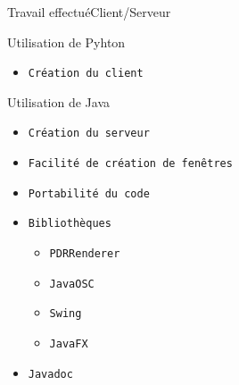 \documentclass[10pt]{beamer}
\begin{document}
\begin{frame}{Travail effectué}{Client/Serveur}
	\begin{block}{Utilisation de Pyhton}
	  	\begin{itemize}
	  		\item {\tt Création du client}		
		\end{itemize}
	\end{block}


	\begin{block}{Utilisation de Java}
	  	\begin{itemize}
	  		\item {\tt Création du serveur}
    			\item {\tt Facilité de création de fenêtres}
	    		\item {\tt Portabilité du code}
	    		\item {\tt Bibliothèques}
	    	  	\begin{itemize}
		  		\item {\tt PDRRenderer}
	    			\item {\tt JavaOSC}
	    			\item {\tt Swing}
	    			\item {\tt JavaFX}
			\end{itemize}
	    		\item {\tt Javadoc}
		\end{itemize}
	\end{block}
		  			
\end{frame}
\end{document}
